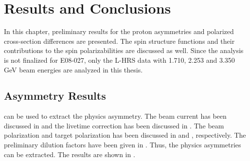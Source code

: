 
\chapter{Results and Conclusions}
\label{C8}

In this chapter, preliminary results for the proton asymmetries and polarized cross-section differences are presented. The spin structure functions and their contributions to the spin polarizabilities are discussed as well. Since the analysis is not finalized for E08-027, only the L-HRS data with 1.710, 2.253 and 3.350 GeV beam energies are analyzed in this thesis.

\section{Asymmetry Results}
\label{C8S1}

 can be used to extract the physics asymmetry. The beam current has been discussed in  and the livetime correction has been discussed in . The beam polarization and target polarization has been discussed in  and , respectively. The preliminary dilution factors have been given in . Thus, the physics asymmetries can be extracted. The results are shown in .

